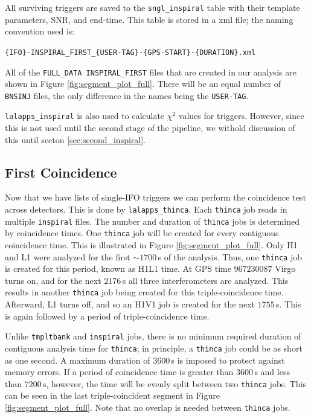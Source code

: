 All surviving triggers are saved to the \texttt{sngl\_inspiral} table with their template parameters, \ac{SNR}, and end-time. This table is stored in a xml file; the naming convention used is:
\begin{center}
\texttt{\{IFO\}-INSPIRAL\_FIRST\_\{USER-TAG\}-\{GPS-START\}-\{DURATION\}.xml}
\end{center}
All of the \texttt{FULL\_DATA INSPIRAL\_FIRST} files that are created in our analysis are shown in Figure \ref{fig:segment_plot_full}. There will be an equal number of \texttt{BNSINJ} files, the only difference in the names being the \texttt{USER-TAG}.

\texttt{lalapps\_inspiral} is also used to calculate $\chi^2$ values for triggers. However, since this is not used until the second stage of the pipeline, we withold discussion of this until secton \ref{sec:second_inspiral}.

\subsection{First Coincidence}
\label{sec:first_thinca}

Now that we have lists of single-\ac{IFO} triggers we can perform the coincidence test across detectors. This is done by \texttt{lalapps\_thinca}. Each \texttt{thinca} job reads in multiple \texttt{inspiral} files. The number and duration of \texttt{thinca} jobs is determined by coincidence times. One \texttt{thinca} job will be created for every contiguous coincidence time. This is illustrated in Figure \ref{fig:segment_plot_full}. Only H1 and L1 were analyzed for the first $\sim1700\,$s of the analysis. Thus, one \texttt{thinca} job is created for this period, known as H1L1 time. At GPS time $967230087$ Virgo turns on, and for the next $2176\,$s all three interferometers are analyzed. This results in another \texttt{thinca} job being created for this triple-coincidence time. Afterward, L1 turns off, and so an H1V1 job is created for the next $1755\,$s. This is again followed by a period of triple-coincidence time.

Unlike \texttt{tmpltbank} and \texttt{inspiral} jobs, there is no minimum required duration of contiguous analysis time for \texttt{thinca}; in principle, a \texttt{thinca} job could be as short as one second. A maximum duration of $3600\,$s is imposed to protect against memory errors. If a period of coincidence time is greater than $3600\,$s and less than $7200\,$s, however, the time will be evenly split between two \texttt{thinca} jobs. This can be seen in the last triple-coincident segment in Figure \ref{fig:segment_plot_full}. Note that no overlap is needed between \texttt{thinca} jobs.

